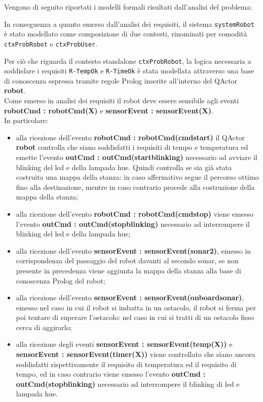\documentclass{llncs}
\newcommand{\action}[1]{\texttt{#1}\xspace}
\newcommand{\code}[1]{{\color{blue}\small{\texttt{#1}}}}
\begin{document}
Vengono di seguito riportati i modelli formali risultati dall'analisi del problema: 




In conseguenza a quanto emerso dall'analisi dei requisiti, il sistema \action{systemRobot} è stato modellato come composizione di due contesti, rinominati per comodità \action{ctxProbRobot} e \action{ctxProbUser}. 

Per ciò che riguarda il contesto standalone \action{ctxProbRobot}, la logica necessaria a soddisfare i requisiti \code{R-TempOk} e \code{R-TimeOk} è stata modellata attraverso una base di conoscenza espressa tramite regole Prolog inserite all'interno del QActor \textbf{robot}. \\ Come emerso in analisi dei requisiti il robot deve essere sensibile agli eventi \textbf{robotCmd : robotCmd(X)} e \textbf{sensorEvent : sensorEvent(X)}. \\ In particolare: 
\begin{itemize}
	\item alla ricezione dell'evento \textbf{robotCmd : robotCmd(cmdstart)} il QActor \textbf{robot} controlla che siano soddisfatti i requisiti di tempo e temperatura ed emette l'evento \textbf{outCmd : outCmd(startblinking)} necessario ad avviare il blinking del led e della lampada hue. Quindi controlla se sia già stata costruita una mappa della stanza: in caso affermativo segue il percorso ottimo fino alla destinazione, mentre in caso contrario procede alla costruzione della mappa della stanza;
	\item alla ricezione dell'evento \textbf{robotCmd : robotCmd(cmdstop)} viene emesso l'evento \textbf{outCmd : outCmd(stopblinking)} necessario ad interrompere il blinking del led e della lampada hue;
	\item alla ricezione dell'evento \textbf{sensorEvent : sensorEvent(sonar2)}, emesso in corrispondenza del passaggio del robot davanti al secondo sonar, se non presente in precedenza viene aggiunta la mappa della stanza alla base di conoscenza Prolog del robot;
	\item alla ricezione dell'evento \textbf{sensorEvent : sensorEvent(onboardsonar)}, emesso nel caso in cui il robot si imbatta in un ostacolo, il robot si ferma per poi tentare di superare l'ostacolo: nel caso in cui si tratti di un ostacolo fisso cerca di aggirarlo;
	\item alla ricezione degli eventi \textbf{sensorEvent : sensorEvent(temp(X))} e \textbf{sensorEvent : sensorEvent(timer(X))} viene controllato che siano ancora soddisfatti rispettivamente il requisito di temperatura ed il requisito di tempo, ed in caso contrario viene emesso l'evento \textbf{outCmd : outCmd(stopblinking)} necessario ad interrompere il blinking di led e lampada hue.
\end{itemize}
\end{document}
